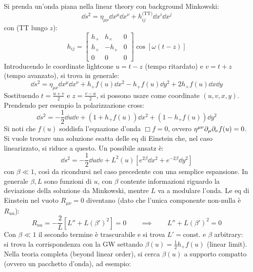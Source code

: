 Si prenda un'onda piana nella linear theory con background Minkowski:
\begin{equation*}
  \dd s^2 = \eta_{\mu \nu} \dd x^\mu \dd x^\nu + h_{ij}^\text{(TT)} \dd x^i \dd x^j
\end{equation*}
con (TT lungo $ z $):
\begin{equation*}
  h_{ij} =
  \begin{bmatrix}
    h_+ & h_\times & 0 \\
    h_\times & -h_+ & 0 \\
    0 & 0 & 0
  \end{bmatrix}
  \cos [\omega (t - z)]
\end{equation*}
Introducendo le coordinate lightcone $ u = t - z $ (tempo ritardato) e $ v = t + z $ (tempo avanzato), si trova in generale:
\begin{equation*}
  \dd s^2 = \eta_{\mu \nu} \dd x^\mu \dd x^\nu + h_+ f(u) \dd x^2 - h_+ f(u) \dd y^2 + 2 h_\times f(u) \dd x \dd y
\end{equation*}
Sostituendo $ t = \frac{u + v}{2} $ e $ z = \frac{v - u}{2} $, si possono usare come coordinate $ (u,v,x,y) $. Prendendo per esempio la polarizzazione cross:
\begin{equation*}
  \dd s^2 = - \frac{1}{2} \dd u \dd v + (1 + h_+ f(u)) \dd x^2 + (1 - h_+ f(u)) \dd y^2
\end{equation*}
Si noti che $ f(u) $ soddisfa l'equazione d'onda $ \Box f = 0 $, ovvero $ \eta^{\mu \nu} \partial_\mu \partial_\nu f(u) = 0 $. Si vuole trovare una soluzione esatta delle eq di Einstein che, nel caso linearizzato, si riduce a questo. Un possibile ansatz è:
\begin{equation*}
  \dd s^2 = - \frac{1}{2} \dd u \dd v + L^2(u) \left[ e^{2\beta} \dd x^2 + e^{-2\beta} \dd y^2 \right]
\end{equation*}
con $ \beta \ll 1 $, così da ricondursi nel caso precedente con una semplice espansione. In generale $ \beta , L $ sono funzioni di $ u $, con $ \beta $ contente informazioni riguardo la deviazione della soluzione da Minkowski, mentre $ L $ va a modulare l'onda. Le eq di Einstein nel vuoto $ R_{\mu \nu} = 0 $ diventano (dato che l'unica componente non-nulla è $ R_{uu} $):
\begin{equation*}
  R_{uu} = - \frac{2}{L} \left[ L'' + L (\beta')^2 \right] = 0
  \qquad \implies \qquad
  L'' + L (\beta')^2 = 0
\end{equation*}
Con $ \beta \ll 1 $ il secondo termine è trascurabile e si trova $ L' = \text{const.} $ e $ \beta $ arbitrary: si trova la corrispondenza con la GW settando $ \beta(u) = \frac{1}{2} h_+ f(u) $ (linear limit). Nella teoria completa (beyond linear order), si cerca $ \beta(u) $ a supporto compatto (ovvero un pacchetto d'onda), ad esempio:
